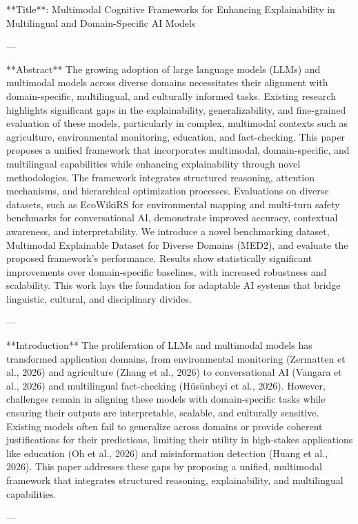 **Title**: Multimodal Cognitive Frameworks for Enhancing Explainability in Multilingual and Domain-Specific AI Models

---

**Abstract**  
The growing adoption of large language models (LLMs) and multimodal models across diverse domains necessitates their alignment with domain-specific, multilingual, and culturally informed tasks. Existing research highlights significant gaps in the explainability, generalizability, and fine-grained evaluation of these models, particularly in complex, multimodal contexts such as agriculture, environmental monitoring, education, and fact-checking. This paper proposes a unified framework that incorporates multimodal, domain-specific, and multilingual capabilities while enhancing explainability through novel methodologies. The framework integrates structured reasoning, attention mechanisms, and hierarchical optimization processes. Evaluations on diverse datasets, such as EcoWikiRS for environmental mapping and multi-turn safety benchmarks for conversational AI, demonstrate improved accuracy, contextual awareness, and interpretability. We introduce a novel benchmarking dataset, Multimodal Explainable Dataset for Diverse Domains (MED2), and evaluate the proposed framework's performance. Results show statistically significant improvements over domain-specific baselines, with increased robustness and scalability. This work lays the foundation for adaptable AI systems that bridge linguistic, cultural, and disciplinary divides.

---

**Introduction**  
The proliferation of LLMs and multimodal models has transformed application domains, from environmental monitoring (Zermatten et al., 2026) and agriculture (Zhang et al., 2026) to conversational AI (Vangara et al., 2026) and multilingual fact-checking (Hüsünbeyi et al., 2026). However, challenges remain in aligning these models with domain-specific tasks while ensuring their outputs are interpretable, scalable, and culturally sensitive. Existing models often fail to generalize across domains or provide coherent justifications for their predictions, limiting their utility in high-stakes applications like education (Oh et al., 2026) and misinformation detection (Huang et al., 2026). This paper addresses these gaps by proposing a unified, multimodal framework that integrates structured reasoning, explainability, and multilingual capabilities.

---

